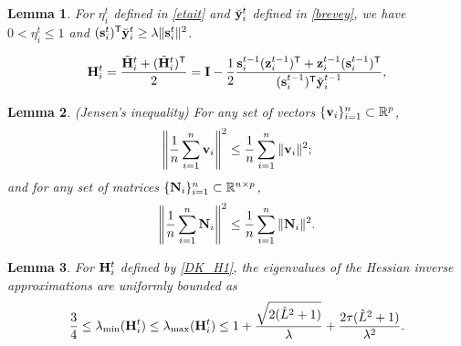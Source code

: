 \documentclass[10pt,a4paper]{amsart}
\newtheorem{lemma}{Lemma}
\newcommand{\m}[1]{{\bf{#1}}}
\newcommand{\tr}{^{\sf T}}
\begin{document}
\begin{lemma}\label{lem 2.7}
	For $\eta_i^t$ defined in \eqref{etait} and $\breve{\m{y}}^{t}_i$ defined in \eqref{brevey}, we have $0<{\eta}_i^t
	\leq1$ and $(\m{s}^{t}_{i})\tr\breve{\m{y}}^{t}_i \geq \lambda\|\m{s}^{t}_{i}\|^2$.
\end{lemma}

\begin{equation}\label{DK_H1}
	{\m{H}}_i^{t}=\frac{\tilde{\m{H}}_i^{t}+(\tilde{\m{H}}_i^{t})\tr}{2}=\m{I}-\frac{1}{2}\frac{\m{s}^{t-1}_{i}(\m{z}^{t-1}_i)\tr+\m{z}^{t-1}_i(\m{s}^{t-1}_{i})\tr}{(\m{s}^{t-1}_{i})\tr\breve{\m{y}}^{t-1}_i},
\end{equation}

\begin{lemma}\label{important}
	(Jensen's inequality) For any set of vectors $\{\m{v}_i\}_{i=1}^n \subset \mathbb{R}^p$,
	$$\left\|\frac{1}{n}\sum_{i=1}^n\m{v}_i\right\|^2\leq\frac{1}{n}\sum_{i=1}^n\|\m{v}_i\|^2;$$ 
	and for any set of matrices $\{\m{N}_i\}_{i=1}^n \subset \mathbb{R}^{n\times p}$,
	$$\left\|\frac{1}{n}\sum_{i=1}^n\m{N}_i\right\|^2\leq\frac{1}{n}\sum_{i=1}^n\|\m{N}_i\|^2.$$ 
\end{lemma}

\begin{lemma}\label{lem 2.8}
	For ${\m{H}}_i^{t}$ defined by \eqref{DK_H1}, the eigenvalues of the Hessian inverse approximations are uniformly bounded as
	$$
	\frac{3}{4} \leq \lambda_{\min}({\m{H}}_i^{t}) \leq \lambda_{\max}({\m{H}}_i^{t}) \leq 1 + \frac{\sqrt{2(\hat{L}^2+1)}}{\lambda} + \frac{2\tau(\hat{L}^2+1)}{\lambda^2}.
	$$
\end{lemma}
\end{document}
